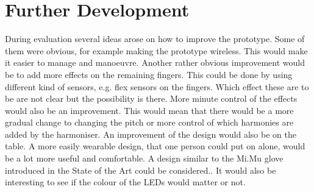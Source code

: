\section{Further Development}

During evaluation several ideas arose on how to improve the prototype. Some of them were obvious, for example making the prototype wireless. This would make it easier to manage and manoeuvre. 
Another rather obvious improvement would be to add more effects on the remaining fingers. This could be done by using different kind of sensors, e.g. flex sensors on the fingers.
Which effect these are to be are not clear but the possibility is there.
More minute control of the effects would also be an improvement. This would mean that there would be a more gradual change to changing the pitch or more control of which harmonies are added by the harmoniser. 
An improvement of the design would also be on the table. A more easily wearable design, that one person could put on alone, would be a lot more useful and comfortable. A design similar to the Mi.Mu glove introduced in the State of the Art could be considered..
It would also be interesting to see if the colour of the LEDs would matter or not.